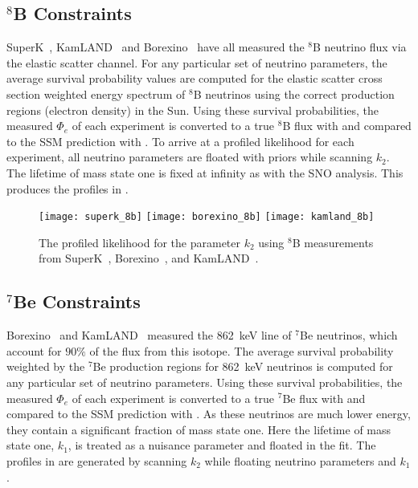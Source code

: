 \subsection{$^8$B Constraints}

SuperK~\cite{superkiv}, KamLAND~\cite{kamland8b} and Borexino~\cite{borexino8b} have all measured the $^8$B neutrino flux via the elastic scatter channel. 
For any particular set of neutrino parameters, the average survival probability values are computed for the elastic scatter cross section weighted energy spectrum of $^8$B neutrinos using the correct production regions (electron density) in the Sun. 
Using these survival probabilities, the measured $\Phi_e$ of each experiment is converted to a true $^8$B flux with  and compared to the SSM prediction with .
To arrive at a profiled likelihood for each experiment, all neutrino parameters are floated with priors while scanning $k_2$. The lifetime of mass state one is fixed at infinity as with the SNO analysis. 
This produces the profiles in .

\begin{figure}
\centering
\texttt{[image: superk\_8b]}
\texttt{[image: borexino\_8b]}
\texttt{[image: kamland\_8b]}
\caption{The profiled likelihood for the parameter $k_2$ using $^8$B measurements from SuperK~\cite{superkiv}, Borexino~\cite{borexino8b}, and KamLAND~\cite{kamland8b}.}
\label{fig:8b_profiles}
\end{figure}

\subsection{$^7$Be Constraints}

Borexino~\cite{borexino7be} and KamLAND~\cite{kamland7be} measured the 862~keV line of $^7$Be neutrinos, which account for $90\%$ of the flux from this isotope. 
The average survival probability weighted by the $^7$Be production regions for 862~keV neutrinos is computed for any particular set of neutrino parameters.
Using these survival probabilities, the measured $\Phi_e$ of each experiment is converted to a true $^7$Be flux with  and compared to the SSM prediction with . 
As these neutrinos are much lower energy, they contain a significant fraction of mass state one. 
Here the lifetime of mass state one, $k_1$, is treated as a nuisance parameter and floated in the fit. 
The profiles in  are generated by scanning $k_2$ while floating neutrino parameters and $k_1$.

